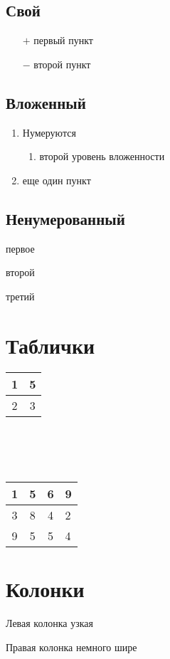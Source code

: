 \documentclass[12pt]{article}
\begin{document}
\subsection{Свой}
\begin{itemize}
\item[$+$] первый пункт
\item[$-$] второй пункт
\end{itemize}


\subsection{Вложенный}
\begin{enumerate}
\item Нумеруются
\begin{enumerate}
\item второй уровень вложенности
\end{enumerate}
\item еще один пункт
\end{enumerate}

\subsection{Ненумерованный}
\begin{trivlist}
\item первое
\item второй
\item третий
\end{trivlist}

\section{Таблички}
\begin{tabular}{|c|c||}
1 & 5 \\
\hline
2 & 3
\end{tabular}
\\
\\
\\
\begin{tabular}{|c|c|c|p{6cm}|}
\hline
1 & 5 & 6 & 9 \\
\hline
3 & 8 & 4 & 2 \\
\hline
9 & 5 & 5 & 4\\
\hline
\end{tabular}


\section{Колонки}
\begin{minipage}[t]{14mm}
Левая колонка узкая
\end{minipage}
\hfill
\begin{minipage}[t]{38mm}
Правая колонка немного шире
\end{minipage}
\end{document}
